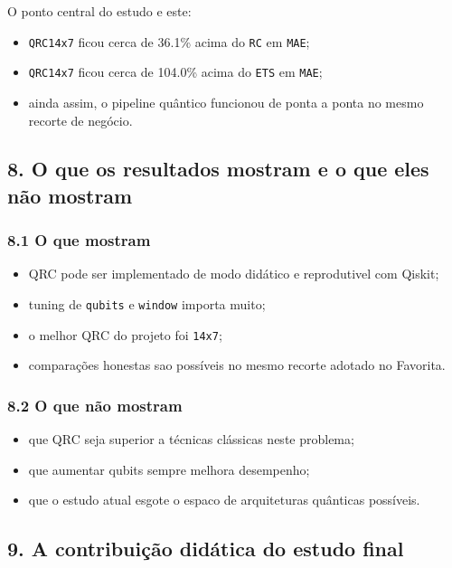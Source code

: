 \documentclass[12pt]{article}
\providecommand{\tightlist}{%
          \setlength{\itemsep}{0pt}\setlength{\parskip}{0pt}}
\begin{document}
O ponto central do estudo e este:

\begin{itemize}
\tightlist
\item
  \texttt{QRC14x7} ficou cerca de 36.1\% acima do \texttt{RC} em \texttt{MAE};
\item
  \texttt{QRC14x7} ficou cerca de 104.0\% acima do \texttt{ETS} em \texttt{MAE};
\item
  ainda assim, o pipeline quântico funcionou de ponta a ponta no mesmo recorte de negócio.
\end{itemize}

\subsection{8. O que os resultados mostram e o que eles não mostram}\label{8-o-que-os-resultados-mostram-e-o-que-eles-nuxe3o-mostram}

\subsubsection{8.1 O que mostram}\label{81-o-que-mostram}

\begin{itemize}
\tightlist
\item
  QRC pode ser implementado de modo didático e reprodutivel com Qiskit;
\item
  tuning de \texttt{qubits} e \texttt{window} importa muito;
\item
  o melhor QRC do projeto foi \texttt{14x7};
\item
  comparações honestas sao possíveis no mesmo recorte adotado no Favorita.
\end{itemize}

\subsubsection{8.2 O que não mostram}\label{82-o-que-nuxe3o-mostram}

\begin{itemize}
\tightlist
\item
  que QRC seja superior a técnicas clássicas neste problema;
\item
  que aumentar qubits sempre melhora desempenho;
\item
  que o estudo atual esgote o espaco de arquiteturas quânticas possíveis.
\end{itemize}

\subsection{9. A contribuição didática do estudo final}\label{9-a-contribuiuxe7uxe3o-diduxe1tica-do-estudo-final}
\end{document}
